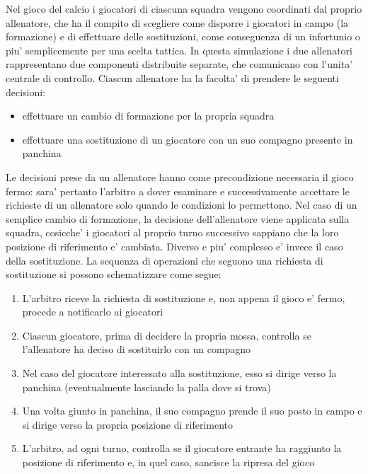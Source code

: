 
Nel gioco del calcio i giocatori di ciascuna squadra vengono coordinati dal proprio allenatore, che ha il compito di scegliere come disporre i giocatori in campo (la formazione) e di effettuare delle sostituzioni, come conseguenza di un infortunio o piu' semplicemente per una scelta tattica. In questa simulazione i due allenatori rappresentano due componenti distribuite separate, che comunicano con l'unita' centrale di controllo. Ciascun allenatore ha la facolta' di prendere le seguenti decisioni:

\begin{itemize}
	\item effettuare un cambio di formazione per la propria squadra
	\item effettuare una sostituzione di un giocatore con un suo compagno presente in panchina
\end{itemize}

Le decisioni prese da un allenatore hanno come precondizione necessaria il gioco fermo: sara' pertanto l'arbitro a dover esaminare e successivamente accettare le richieste di un allenatore solo quando le condizioni lo permettono. Nel caso di un semplice cambio di formazione, la decisione dell'allenatore viene applicata sulla squadra, cosicche' i giocatori al proprio turno successivo sappiano che la loro posizione di riferimento e' cambiata. Diverso e piu' complesso e' invece il caso della sostituzione. La sequenza di operazioni che seguono una richiesta di sostituzione si possono schematizzare come segue:

\begin{enumerate}
	\item L'arbitro riceve la richiesta di sostituzione e, non appena il gioco e' fermo, procede a notificarlo ai giocatori
	\item Ciascun giocatore, prima di decidere la propria mossa, controlla se l'allenatore ha deciso di sostituirlo con un compagno
	\item Nel caso del giocatore interessato alla sostituzione, esso si dirige verso la panchina (eventualmente lasciando la palla dove si trova)
	\item Una volta giunto in panchina, il suo compagno prende il suo posto in campo e si dirige verso la propria posizione di riferimento
	\item L'arbitro, ad ogni turno, controlla se il giocatore entrante ha raggiunto la posizione di riferimento e, in quel caso, sancisce la ripresa del gioco
\end{enumerate}

